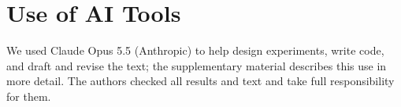 \section*{Use of AI Tools}
We used Claude Opus 5.5 (Anthropic) to help design experiments, write code, and draft and revise the text; the supplementary material describes this use in more detail. The authors checked all results and text and take full responsibility for them.
